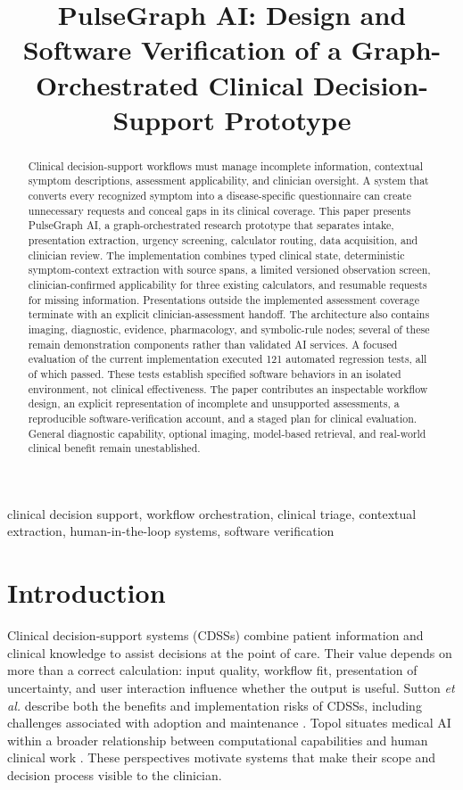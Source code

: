 \documentclass[conference]{IEEEtran}
\title{PulseGraph AI: Design and Software Verification of a Graph-Orchestrated Clinical Decision-Support Prototype}
\author{\IEEEauthorblockN{Author Name(s)}
\IEEEauthorblockA{Department and Institution\\City, Country\\Email Address}}
\begin{document}
\maketitle

\begin{abstract}
Clinical decision-support workflows must manage incomplete information, contextual symptom descriptions, assessment applicability, and clinician oversight. A system that converts every recognized symptom into a disease-specific questionnaire can create unnecessary requests and conceal gaps in its clinical coverage. This paper presents PulseGraph AI, a graph-orchestrated research prototype that separates intake, presentation extraction, urgency screening, calculator routing, data acquisition, and clinician review. The implementation combines typed clinical state, deterministic symptom-context extraction with source spans, a limited versioned observation screen, clinician-confirmed applicability for three existing calculators, and resumable requests for missing information. Presentations outside the implemented assessment coverage terminate with an explicit clinician-assessment handoff. The architecture also contains imaging, diagnostic, evidence, pharmacology, and symbolic-rule nodes; several of these remain demonstration components rather than validated AI services. A focused evaluation of the current implementation executed 121 automated regression tests, all of which passed. These tests establish specified software behaviors in an isolated environment, not clinical effectiveness. The paper contributes an inspectable workflow design, an explicit representation of incomplete and unsupported assessments, a reproducible software-verification account, and a staged plan for clinical evaluation. General diagnostic capability, optional imaging, model-based retrieval, and real-world clinical benefit remain unestablished.
\end{abstract}

\begin{IEEEkeywords}
clinical decision support, workflow orchestration, clinical triage, contextual extraction, human-in-the-loop systems, software verification
\end{IEEEkeywords}

\section{Introduction}
Clinical decision-support systems (CDSSs) combine patient information and clinical knowledge to assist decisions at the point of care. Their value depends on more than a correct calculation: input quality, workflow fit, presentation of uncertainty, and user interaction influence whether the output is useful. Sutton \emph{et al.} describe both the benefits and implementation risks of CDSSs, including challenges associated with adoption and maintenance \cite{sutton}. Topol situates medical AI within a broader relationship between computational capabilities and human clinical work \cite{topol}. These perspectives motivate systems that make their scope and decision process visible to the clinician.
\end{document}
